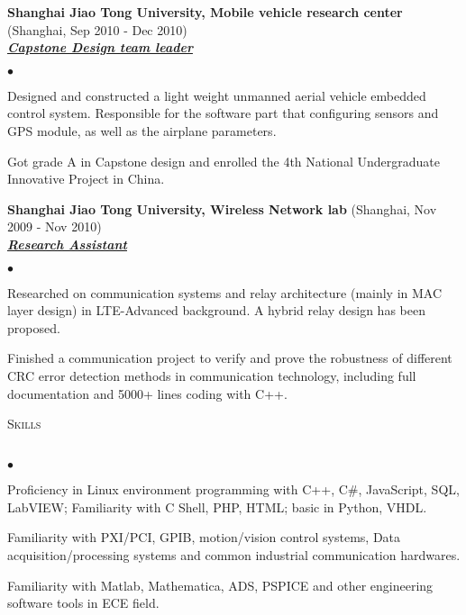 \documentclass{article}
\newcommand{\lineunder}{\vspace*{-8pt} \\ \hspace*{-18pt} \hrulefill \\}
\newcommand{\header}[1]{{\hspace*{-15pt}\vspace*{6pt} \textsc{#1}} \vspace*{-6pt} \lineunder}
\newcommand{\employer}[3]{{ \textbf{#1} (#2)\\ \underline{\textbf{\emph{#3}}}\\  }}
\newenvironment{achievements}{\begin{list}{$\bullet$}{\topsep 0pt \itemsep -2pt}}{\vspace*{4pt}\end{list}}
\begin{document}
\employer{Shanghai Jiao Tong University, Mobile vehicle research center}{Shanghai, Sep 2010 - Dec 2010}{Capstone Design team leader}
	\begin{achievements}
	\item Designed and constructed a light weight unmanned aerial vehicle embedded control system. Responsible for the software part that configuring sensors and GPS module, as well as the airplane parameters.
	\item Got grade A in Capstone design and enrolled the 4th National Undergraduate Innovative Project in China.
	\end{achievements}

\employer{Shanghai Jiao Tong University, Wireless Network lab}{Shanghai, Nov 2009 - Nov 2010}
	{Research Assistant}
	\begin{achievements}
	\item Researched on communication systems and relay architecture (mainly in MAC layer design) in LTE-Advanced
	      background. A hybrid relay design has been proposed.
	\item Finished a communication project to verify and prove the robustness of different CRC error
	      detection methods in communication technology, including full documentation and 5000+ lines coding
	      with C++.
	\end{achievements}



\header{Skills}
\begin{achievements}
\item Proficiency in Linux environment programming with C++, C\#, JavaScript, SQL, LabVIEW; Familiarity with C Shell, PHP, HTML; basic in Python, VHDL.
\item Familiarity with PXI/PCI, GPIB, motion/vision control systems, Data acquisition/processing systems and common industrial communication hardwares.
\item Familiarity with Matlab, Mathematica, ADS, PSPICE and other engineering software tools in ECE field.
\end{achievements}

\end{document}
